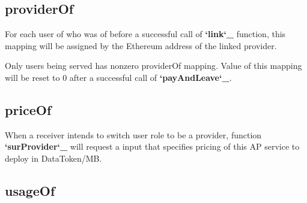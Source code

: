 \documentclass[letterpaper,10pt,english]{sphinxmanual}
\begin{document}
\subsection{providerOf}
\label{\detokenize{ContractVariables:providerof}}
%
\begin{sphinxVerbatim}[commandchars=\\\{\}]
     
\end{sphinxVerbatim}

For each user of  who was of  before a successful call of {\color{red}\bfseries{}{}`link{}`\_} function,
this mapping will be assigned by the Ethereum address of the linked provider.

Only users being served has nonzero providerOf mapping.
Value of this mapping will be reset to 0 after a successful call of {\color{red}\bfseries{}{}`payAndLeave{}`\_}.


\subsection{priceOf}
\label{\detokenize{ContractVariables:priceof}}
%
\begin{sphinxVerbatim}[commandchars=\\\{\}]
     
\end{sphinxVerbatim}

When a receiver intends to switch user role to be a provider,
function {\color{red}\bfseries{}{}`surProvider{}`\_} will request a input that specifies pricing of this AP service to deploy in DataToken/MB.


\subsection{usageOf}
\label{\detokenize{ContractVariables:usageof}}
%
\begin{sphinxVerbatim}[commandchars=\\\{\}]
        
\end{sphinxVerbatim}
\end{document}
